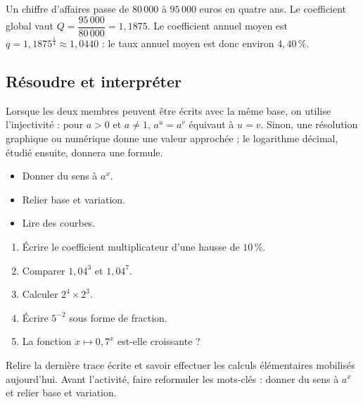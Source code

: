\begin{exemple}
Un chiffre d'affaires passe de $80\,000$ à $95\,000$ euros en quatre ans. Le coefficient global vaut $Q=\dfrac{95\,000}{80\,000}=1{,}1875$. Le coefficient annuel moyen est $q=1{,}1875^{\frac14}\approx1{,}0440$ : le taux annuel moyen est donc environ $4{,}40\,\%$.
\end{exemple}

\subsection{Résoudre et interpréter}
Lorsque les deux membres peuvent être écrits avec la même base, on utilise l'injectivité : pour $a>0$ et $a\neq1$, $a^u=a^v$ équivaut à $u=v$. Sinon, une résolution graphique ou numérique donne une valeur approchée ; le logarithme décimal, étudié ensuite, donnera une formule.

\begin{objectifs}\begin{itemize}\item Donner du sens à $a^x$.\item Relier base et variation.\item Lire des courbes.\end{itemize}\end{objectifs}
\begin{automatismes}\begin{enumerate}\item Écrire le coefficient multiplicateur d'une hausse de $10\,\%$. \item Comparer $1{,}04^3$ et $1{,}04^7$. \item Calculer $2^4\times2^3$. \item Écrire $5^{-2}$ sous forme de fraction. \item La fonction $x\mapsto0{,}7^x$ est-elle croissante ? \end{enumerate}\end{automatismes}
\begin{prerequis}Relire la dernière trace écrite et savoir effectuer les calculs élémentaires mobilisés aujourd'hui. Avant l'activité, faire reformuler les mots-clés : donner du sens à $a^x$ et relier base et variation.\end{prerequis}

